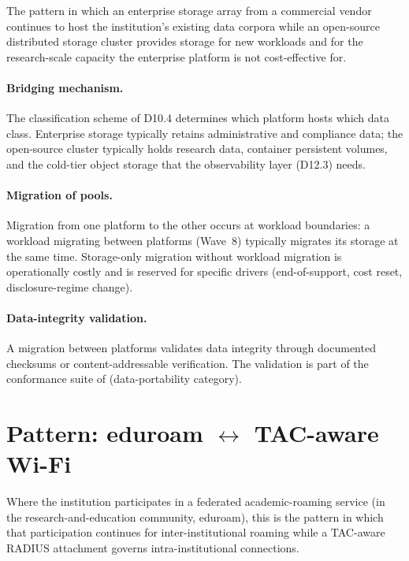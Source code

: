 The pattern in which an enterprise storage array from a commercial
vendor continues to host the institution's existing data corpora
while an open-source distributed storage cluster provides storage
for new workloads and for the research-scale capacity the
enterprise platform is not cost-effective for.

\paragraph{Bridging mechanism.} The classification scheme of
D10.4 determines which platform hosts which data class. Enterprise
storage typically retains administrative and compliance data; the
open-source cluster typically holds research data, container
persistent volumes, and the cold-tier object storage that the
observability layer (D12.3) needs.

\paragraph{Migration of pools.} Migration from one platform to
the other occurs at workload boundaries: a workload migrating
between platforms (Wave~8) typically migrates its storage at the
same time. Storage-only migration without workload migration is
operationally costly and is reserved for specific drivers
(end-of-support, cost reset, disclosure-regime change).

\paragraph{Data-integrity validation.} A migration between
platforms validates data integrity through documented checksums
or content-addressable verification. The validation is part of
the conformance suite of 
(data-portability category).

\section{Pattern: eduroam \texorpdfstring{$\leftrightarrow$}{<->} TAC-aware Wi-Fi}
\label{sec:cp-eduroam-tac}

Where the institution participates in a federated academic-roaming
service (in the research-and-education community, eduroam), this is
the pattern in which that participation continues for
inter-institutional roaming while a TAC-aware RADIUS attachment
governs intra-institutional connections.

